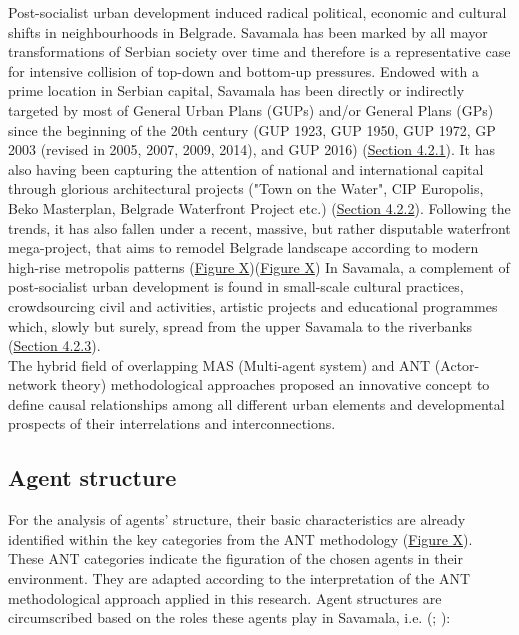 \documentclass[11pt]{report}
\begin{document}
Post-socialist urban development induced radical political, economic and cultural shifts in neighbourhoods in Belgrade. Savamala has been marked by all mayor transformations of Serbian society over time and therefore is a representative case for intensive collision of top-down and bottom-up pressures.
Endowed with a prime location in Serbian capital, Savamala has been directly or indirectly targeted by most of General Urban Plans (GUPs) and/or General Plans (GPs) since the beginning of the 20th century (GUP 1923, GUP 1950, GUP 1972, GP 2003 (revised in 2005, 2007, 2009, 2014), and GUP 2016) (\href{Section 4.2.1}{Section 4.2.1}).
It has also having been capturing the attention of national and international capital through glorious architectural projects ("Town on the Water", CIP Europolis, Beko Masterplan, Belgrade Waterfront Project etc.) (\href{Section 4.2.2}{Section 4.2.2}).
Following the trends, it has also fallen under a recent, massive, but rather disputable waterfront mega-project, that aims to remodel Belgrade landscape according to modern high-rise metropolis patterns (\href{FigureX}{Figure X})(\href{FigureX}{Figure X})
In Savamala, a complement of post-socialist urban development is found in small-scale cultural practices, crowdsourcing civil and  activities, artistic projects and educational programmes which, slowly but surely, spread from the upper Savamala to the riverbanks (\href{Section 4.2.3}{Section 4.2.3}).
\\

The hybrid field of overlapping MAS (Multi-agent system) and ANT (Actor-network theory) methodological approaches proposed an innovative concept to define causal relationships among all different urban elements and developmental prospects of their interrelations and interconnections.

\subsection{Agent structure}

For the analysis of agents' structure, their basic characteristics are already identified within the key categories from the ANT methodology (\href{FigureX}{Figure X}).
These ANT categories indicate the figuration of the chosen agents in their environment. They are adapted according to the interpretation of the ANT methodological approach applied in this research.
Agent structures are circumscribed based on the roles these agents play in Savamala, i.e. (\href{Cvetinovic}{\citealt{CvetinovicEtAl.2016b}}; \href{Cvetinovic}{\citealt{CvetinovicEtAl.2016a}}): %
\end{document}
